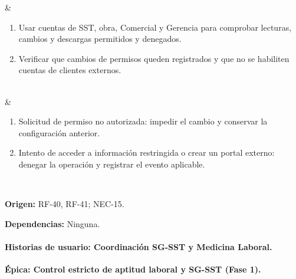 \documentclass[12pt,letterpaper]{article}
\begin{document}
{ & \begin{enumerate}[nosep,leftmargin=*]
\item Usar cuentas de SST, obra, Comercial y Gerencia para comprobar lecturas, cambios y descargas permitidos y denegados.
\item Verificar que cambios de permisos queden registrados y que no se habiliten cuentas de clientes externos.
\end{enumerate}\\\hline
{} & \begin{enumerate}[nosep,leftmargin=*]
\item Solicitud de permiso no autorizada: impedir el cambio y conservar la configuración anterior.
\item Intento de acceder a información restringida o crear un portal externo: denegar la operación y registrar el evento aplicable.
\end{enumerate}\\\hline
}
{\textbf{Origen:} RF-40, RF-41; NEC-15.\par
\textbf{Dependencias:} Ninguna.}

\paragraph{Historias de usuario: Coordinación SG-SST y Medicina Laboral.}\mbox{}\par
\textbf{Épica: Control estricto de aptitud laboral y SG-SST (Fase 1).}\par
\end{document}
